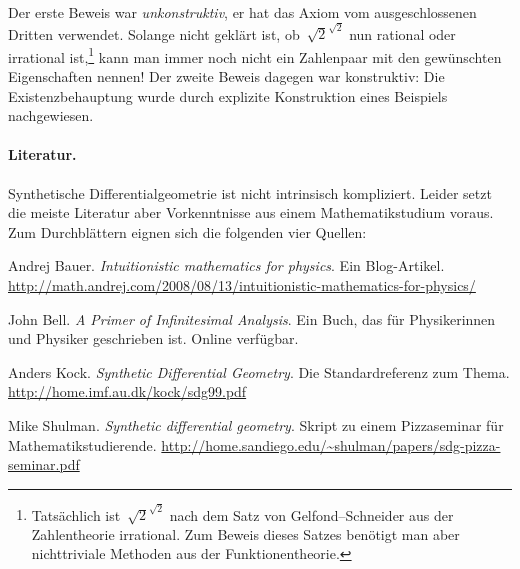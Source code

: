 \documentclass[twoside]{../zirkelblatt}
\theoremstyle{definition}
\theoremstyle{plain}
\theoremstyle{remark}
\begin{document}
Der erste Beweis war \emph{unkonstruktiv}, er hat das Axiom vom
ausgeschlossenen Dritten verwendet. Solange nicht geklärt ist,
ob~$\sqrt{2}^{\sqrt{2}}$ nun rational oder irrational ist,\footnote{Tatsächlich
ist~$\sqrt{2}^{\sqrt{2}}$ nach dem Satz von Gelfond--Schneider aus der
Zahlentheorie irrational. Zum Beweis dieses Satzes benötigt man aber
nichttriviale Methoden aus der Funktionentheorie.} kann man
immer noch nicht ein Zahlenpaar mit den gewünschten Eigenschaften nennen! Der
zweite Beweis dagegen war konstruktiv: Die Existenzbehauptung wurde durch
explizite Konstruktion eines Beispiels nachgewiesen.


\paragraph{Literatur.} Synthetische Differentialgeometrie ist nicht intrinsisch
kompliziert. Leider setzt die meiste Literatur aber Vorkenntnisse aus einem
Mathematikstudium voraus. Zum Durchblättern eignen sich die folgenden vier
Quellen:

\begin{small}
Andrej Bauer. \emph{Intuitionistic mathematics for physics}. Ein
Blog-Artikel.
\url{http://math.andrej.com/2008/08/13/intuitionistic-mathematics-for-physics/}

John Bell. \emph{A Primer of Infinitesimal Analysis}. Ein
Buch, das für Physikerinnen und Physiker geschrieben ist. Online verfügbar.

Anders Kock. \emph{Synthetic Differential Geometry}. Die Standardreferenz
zum Thema. \url{http://home.imf.au.dk/kock/sdg99.pdf}

Mike Shulman. \emph{Synthetic differential geometry}. Skript zu einem
Pizzaseminar für Mathematikstudierende.
\url{http://home.sandiego.edu/~shulman/papers/sdg-pizza-seminar.pdf}
\end{small}
\end{document}

